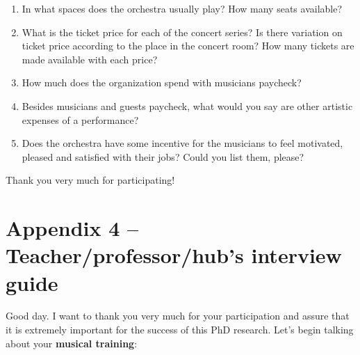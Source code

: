 \documentclass[a4paper, 12pt, openright, oneside, german, french, brazil, english]{abntex2}
\begin{document}
\begin{enumerate}
          \vspace{0.8cm}
          [\textbf{If it is an orchestra:}]
        \item In what spaces does the orchestra usually play? How many seats available?
        \item What is the ticket price for each of the concert series? Is there variation on ticket price according to the place in the concert room? How many tickets are made available with each price?
        \item How much does the organization spend with musicians paycheck?
        \item Besides musicians and guests paycheck, what would you say are other artistic expenses of a performance?
        \item Does the orchestra have some incentive for the musicians to feel motivated, pleased and satisfied with their jobs? Could you list them, please?

        \end{enumerate}

        Thank you very much for participating!
        


        \newpage

        \chapter*[Interview guide]{Appendix 4 -- Teacher/professor/hub's interview guide}

        Good day. I want to thank you very much for your participation and assure that it is extremely important for the success of this PhD research. Let's begin talking about your \textbf{musical training}:
\end{document}
